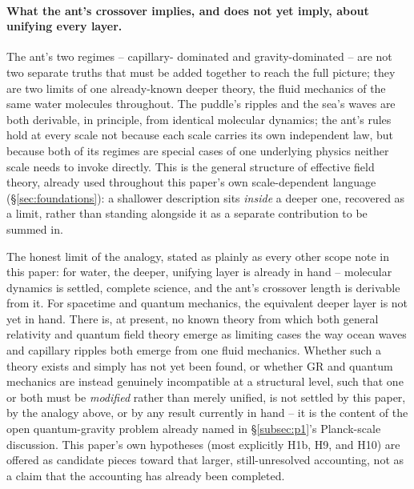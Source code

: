 \documentclass[12pt, a4paper]{article}
\begin{document}
\paragraph{What the ant's crossover implies, and does not yet imply,
about unifying every layer.} The ant's two regimes -- capillary-
dominated and gravity-dominated -- are not two separate truths that
must be added together to reach the full picture; they are two limits
of one already-known deeper theory, the fluid mechanics of the same
water molecules throughout. The puddle's ripples and the sea's waves
are both derivable, in principle, from identical molecular dynamics;
the ant's rules hold at every scale not because each scale carries its
own independent law, but because both of its regimes are special cases
of one underlying physics neither scale needs to invoke directly. This
is the general structure of effective field theory, already used
throughout this paper's own scale-dependent language
(\S\ref{sec:foundations}): a shallower description sits \emph{inside}
a deeper one, recovered as a limit, rather than standing alongside it
as a separate contribution to be summed in.

The honest limit of the analogy, stated as plainly as every other
scope note in this paper: for water, the deeper, unifying layer is
already in hand -- molecular dynamics is settled, complete science,
and the ant's crossover length is derivable from it. For spacetime and
quantum mechanics, the equivalent deeper layer is not yet in hand.
There is, at present, no known theory from which both general
relativity and quantum field theory emerge as limiting cases the way
ocean waves and capillary ripples both emerge from one fluid
mechanics. Whether such a theory exists and simply has not yet been
found, or whether GR and quantum mechanics are instead genuinely
incompatible at a structural level, such that one or both must be
\emph{modified} rather than merely unified, is not settled by this
paper, by the analogy above, or by any result currently in hand -- it
is the content of the open quantum-gravity problem already named in
\S\ref{subsec:p1}'s Planck-scale discussion. This paper's own
hypotheses (most explicitly H1b, H9, and H10) are offered as candidate
pieces toward that larger, still-unresolved accounting, not as a claim
that the accounting has already been completed.
\end{document}
